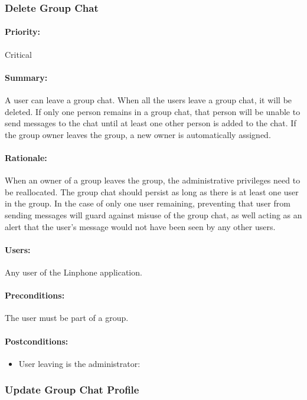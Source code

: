 \documentclass[11pt]{article}
\begin{document}
\subsubsection{Delete Group Chat} \label{UC-delete-group}
\paragraph{Priority:}Critical
\paragraph{Summary:}A user can leave a group chat. When all the users leave a group chat, it will be deleted. If only one person remains in a group chat, that person will be unable to send messages to the chat until at least one other person is added to the chat. If the group owner leaves the group, a new owner is automatically assigned.
\paragraph{Rationale:}When an owner of a group leaves the group, the administrative privileges need to be reallocated. The group chat should persist as long as there is at least one user in the group. In the case of only one user remaining, preventing that user from sending messages will guard against misuse of the group chat, as well acting as an alert that the user's message would not have been seen by any other users.
\paragraph{Users:} Any user of the Linphone application.
\paragraph{Preconditions:} The user must be part of a group.
\paragraph{{Postconditions:}} 
\begin{itemize}
	\item User leaving is the administrator:
\end{itemize}

\subsubsection{Update Group Chat Profile} \label{UC-update-group}
\end{document}
